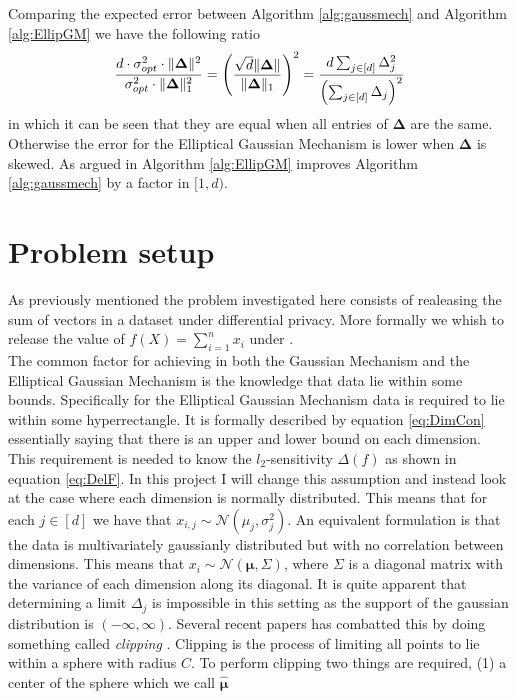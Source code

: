 \documentclass[a4paper,12pt]{article}
\begin{document}
Comparing the expected error between Algorithm \ref{alg:gaussmech} and Algorithm \ref{alg:EllipGM} we have the following ratio
\[
    \frac{d \cdot \sigma_{opt}^2 \cdot \| \bm{\Delta} \|^2 }{\sigma_{opt}^2 \cdot \| \bm{\Delta} \|_1^2} 
    = \left (\frac{\sqrt{d}\| \bm{\Delta} \|}{\| \bm{\Delta} \|_1}\right)^2
    = \frac{d \sum_{j \in [d]} \Delta_j^2}{\left (\sum_{j \in [d]} \Delta_j\right)^2}
\]
in which it can be seen that they are equal when all entries of $\bm{\Delta}$ are the same. Otherwise the error for the Elliptical Gaussian Mechanism is lower
when $\bm{\Delta}$ is skewed. As argued in \cite{Lebeda2022} Algorithm \ref{alg:EllipGM} improves Algorithm \ref{alg:gaussmech} by a factor in $[1,d)$.

\section{Problem setup}
\label{seq:problem}
As previously mentioned the problem investigated here consists of realeasing the sum of vectors 
in a dataset under differential privacy.
More formally we whish to release the value of 
$ f(X) = \sum_{i = 1}^n x_i  $
under \edp. \\
The common factor for achieving \edp in both the Gaussian Mechanism
and the Elliptical Gaussian Mechanism is the knowledge that data lie within some bounds.
Specifically for the Elliptical Gaussian Mechanism data is required to lie within some hyperrectangle.
It is formally described by equation \eqref{eq:DimCon} 
essentially saying that there is an upper and lower bound on each dimension.
This requirement is needed to know the $l_2$-sensitivity $ \Delta(f) $ as shown in equation \eqref{eq:DelF}.
In this project I will change this assumption and instead 
look at the case where each dimension is normally distributed.
This means that for each 
$ j \in [d] $ we have that 
$x_{i,j} \sim \mathcal{N}(\mu_j, \sigma_j^2)$.
An equivalent formulation is that the data is 
multivariately gaussianly distributed but with no correlation between dimensions.
This means that $x_i \sim \mathcal{N}(\bm{\mu}, \Sigma ) $, 
where $\Sigma$ is a diagonal matrix with the variance of each 
dimension along its diagonal.
It is quite apparent that determining a limit $ \Delta_j $ is impossible 
in this setting as the support of the gaussian distribution is $ (-\infty, \infty)$.
Several recent papers has combatted this by doing something called 
\textit{clipping} \cite{Huang2021,coinpress}. 
Clipping is the process of limiting all points to lie within a sphere with radius $C$.
To perform clipping two things are required, (1) a center of the sphere which we call $\bm{\hat{\mu}}$
\end{document}
